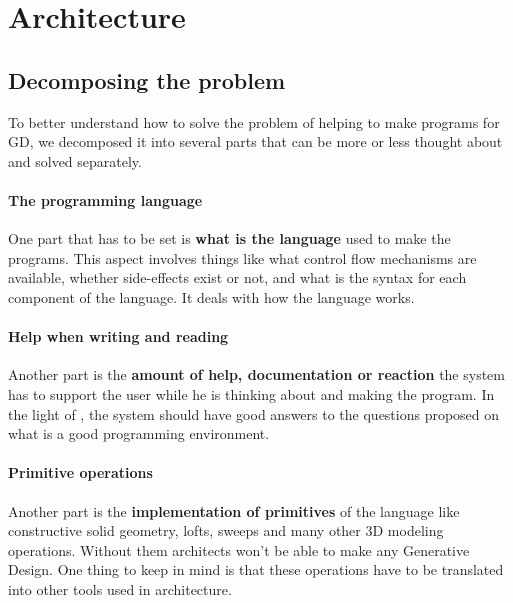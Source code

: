 \documentclass{./llncs2e/llncs}
\begin{document}


\section{Architecture}

\subsection{Decomposing the problem}
	To better understand how to solve the problem of helping to make programs for GD, we decomposed it into several parts that can be more or less thought about and solved separately.
	
	\paragraph{The programming language}
	One part that has to be set is \textbf{what is the language} used to make the programs.
	This aspect involves things like what control flow mechanisms are available, whether side-effects exist or not, and what is the syntax for each component of the language.
	It deals with how the language works.

	\paragraph{Help when writing and reading}
	Another part is the \textbf{amount of help, documentation or reaction} the system has to support the user while he is thinking about and making the program.
	In the light of \cite{victor2012learnable}, the system should have good answers to the questions proposed on what is a good programming environment.

	\paragraph{Primitive operations}
	Another part is the \textbf{implementation of primitives} of the language like constructive solid geometry, lofts, sweeps and many other 3D modeling operations.
	Without them architects won't be able to make any Generative Design.
	One thing to keep in mind is that these operations have to be translated into other tools used in architecture.
\end{document}
